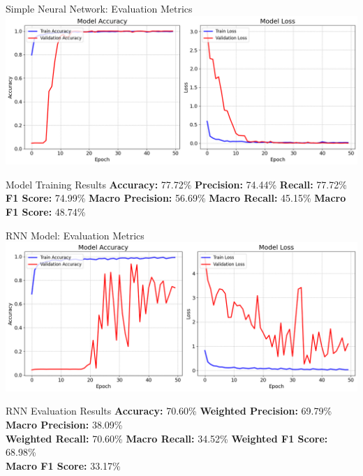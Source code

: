 \begin{frame}{Simple Neural Network: Evaluation Metrics}
	\centering
	\includegraphics[width=0.7\linewidth]{images/paper_2/deeplearning.png}
	\vspace{1em}
	
	\begin{block}{Model Training Results}
		\centering
		\textbf{Accuracy:} 77.72\% \hspace{0.5cm}
		\textbf{Precision:} 74.44\% \hspace{0.5cm}
		\textbf{Recall:} 77.72\% \\
		\textbf{F1 Score:} 74.99\% \hspace{0.5cm}
		\textbf{Macro Precision:} 56.69\% \hspace{0.5cm}
		\textbf{Macro Recall:} 45.15\% \hspace{0.5cm}
		\textbf{Macro F1 Score:} 48.74\%
	\end{block}
\end{frame}

\begin{frame}{RNN Model: Evaluation Metrics}
	\centering
	\includegraphics[width=0.7\linewidth]{images/paper_2/Rnn Accuracy Plot}   
	\vspace{1em}
	
	\begin{block}{RNN Evaluation Results}
		\centering
		\textbf{Accuracy:} 70.60\% \hspace{0.5cm}
		\textbf{Weighted Precision:} 69.79\% \hspace{0.5cm}
		\textbf{Macro Precision:} 38.09\% \\
		\textbf{Weighted Recall:} 70.60\% \hspace{0.5cm}
		\textbf{Macro Recall:} 34.52\% \hspace{0.5cm}
		\textbf{Weighted F1 Score:} 68.98\% \\
		\textbf{Macro F1 Score:} 33.17\%
	\end{block}
\end{frame}


